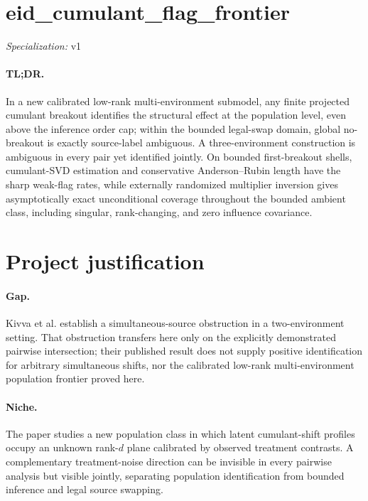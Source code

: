 \documentclass{article}
\begin{document}
\sloppy

\section*{eid\_\allowbreak{}cumulant\_\allowbreak{}flag\_\allowbreak{}frontier}

\noindent\textit{Specialization:} v1\par

\paragraph{TL;DR.} In a new calibrated low-rank multi-environment submodel, any finite projected cumulant breakout identifies the structural effect at the population level, even above the inference order cap; within the bounded legal-swap domain, global no-breakout is exactly source-label ambiguous.  A three-environment construction is ambiguous in every pair yet identified jointly.  On bounded first-breakout shells, cumulant-SVD estimation and conservative Anderson--Rubin length have the sharp weak-flag rates, while externally randomized multiplier inversion gives asymptotically exact unconditional coverage throughout the bounded ambient class, including singular, rank-changing, and zero influence covariance.

\section{Project justification}

\paragraph{Gap.} Kivva et al. establish a simultaneous-source obstruction in a two-environment setting.  That obstruction transfers here only on the explicitly demonstrated pairwise intersection; their published result does not supply positive identification for arbitrary simultaneous shifts, nor the calibrated low-rank multi-environment population frontier proved here.

\paragraph{Niche.} The paper studies a new population class in which latent cumulant-shift profiles occupy an unknown rank-\(d\) plane calibrated by observed treatment contrasts.  A complementary treatment-noise direction can be invisible in every pairwise analysis but visible jointly, separating population identification from bounded inference and legal source swapping.
\end{document}
